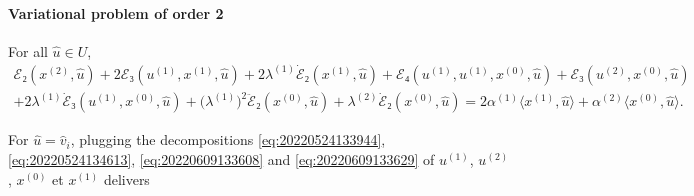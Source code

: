 \documentclass[12pt, final]{scrartcl}
\theoremstyle{definition}
\newcommand{\order}[2][1]{#2^{(#1)}}
\begin{document}
\paragraph{Variational problem of order 2} For all \(\hat{u} ∈ U\),
\begin{multline*}
  ℰ₂(\order[2]x, \hat{u}) + 2ℰ₃(\order[1]u, \order[1]x, \hat{u}) + 2 \order[1]λ \dot{ℰ}₂(\order[1]x, \hat{u}) + ℰ₄(\order[1]u, \order[1]u, \order[0]x, \hat{u}) + ℰ₃(\order[2]u, \order[0]x, \hat{u})\\
  + 2\order[1]λ \dot{ℰ}₃(\order[1]u, \order[0]x, \hat{u}) + \bigl( \order[1]λ \bigr)^2 \ddot{ℰ}₂(\order[0]x, \hat{u}) + \order[2]λ \dot{ℰ}₂(\order[0]x, \hat{u}) = 2 \order[1]α 〈 \order[1]x, \hat{u} 〉 + \order[2]α 〈 \order[0]x, \hat{u} 〉.
\end{multline*}

For \(\hat{u} = \hat{v}_i\), plugging the decompositions
\eqref{eq:20220524133944}, \eqref{eq:20220524134613}, \eqref{eq:20220609133608}
and \eqref{eq:20220609133629} of \(\order[1]u\), \(\order[2]u\), \(\order[0]x \) et \(\order[1]x\) delivers
\end{document}
